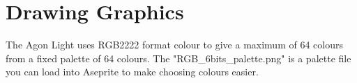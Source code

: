 \chapter{Drawing Graphics}
\hypertarget{md_docs_2pages_2drawing-graphics}{}\label{md_docs_2pages_2drawing-graphics}
\label{md_docs_2pages_2drawing-graphics_autotoc_md13}%
%
 The Agon Light uses RGB2222 format colour to give a maximum of 64 colours from a fixed palette of 64 colours. The "{}\+RGB\+\_\+6bits\+\_\+palette.\+png"{} is a palette file you can load into Aseprite to make choosing colours easier. 